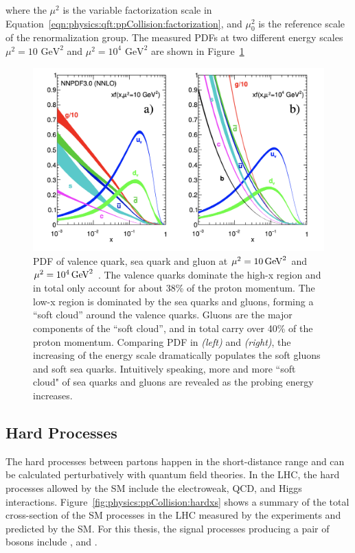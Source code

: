 \noindent where the $\mu^2$ is the variable factorization scale in Equation~\ref{eqn:physics:qft:ppCollision:factorization}, and $\mu^2_0$ is the reference scale of the renormalization group. The measured PDFs at two different energy scales  $\mu^2=10 \text{ GeV}^2$ and $\mu^2=10^4 \text{ GeV}^2$ are shown in Figure~\ref{fig:physics:ppCollision:pdf}
\begin{figure}[ht]
    \centering
    \includegraphics[width = 0.7 \textwidth]{chapters/Physics/sectionPPCollision/figures/pdf.png}
    \caption{PDF of valence quark, sea quark and gluon at $\mu^2=10 \,\text{Ge\hspace{-.08em}V}^2$ and $\mu^2=10^4 \,\text{Ge\hspace{-.08em}V}^2$ \cite{pdg2020}. The valence quarks dominate the high-x region and in total only account for about 38\% of the proton momentum. The low-x region is dominated by the sea quarks and gluons, forming a ``soft cloud'' around the valence quarks. Gluons are the major components of the ``soft cloud'', and in total carry over 40\% of the proton momentum. Comparing PDF in \emph{(left)} and \emph{(right)}, the increasing of the energy scale dramatically populates the soft gluons and soft sea quarks.  Intuitively speaking, more and more ``soft cloud" of sea quarks and gluons are revealed as the probing energy increases.}
    \label{fig:physics:ppCollision:pdf}
\end{figure}



\subsection{Hard Processes}
\label{sec:physics:ppCollision:hardProcess} 


The hard processes between partons happen in the short-distance range and can be calculated perturbatively with quantum field theories. In the LHC, the hard processes allowed by the SM include the electroweak, QCD, and Higgs interactions. Figure~\ref{fig:physics:ppCollision:hardxs} shows a summary of the total cross-section of the SM processes in the LHC measured by the experiments and predicted by the SM. For this thesis, the signal processes producing a pair of \PW bosons include \ttbar, \tW and \WW.


